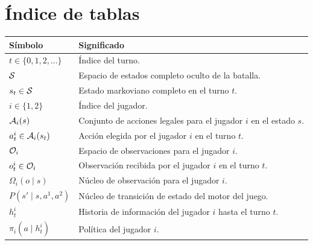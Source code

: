 \section{Índice de tablas}

\begin{table}[h]
    \centering
    \begin{tabular}{ll}
        \toprule
        Símbolo                              & Significado                                                                            \\
        \midrule
        $t \in \{0,1,2,\dots\}$              & Índice del turno.                                                                      \\
        $\mathcal{S}$                                & Espacio de estados completo oculto de la batalla.                                      \\
        $s_t \in \mathcal{S}$                        & Estado markoviano completo en el turno $t$.                                            \\
        $i \in \{1,2\}$                      & Índice del jugador.                                                                    \\
        $\mathcal{A}_i(s)$                           & Conjunto de acciones legales para el jugador $i$ en el estado $s$.                     \\
        $a_t^i \in \mathcal{A}_i(s_t)$               & Acción elegida por el jugador $i$ en el turno $t$.                                     \\
        $\mathcal{O}_i$                              & Espacio de observaciones para el jugador $i$.                                          \\
        $o_t^i \in \mathcal{O}_i$                    & Observación recibida por el jugador $i$ en el turno $t$.                               \\
        $\Omega_i(o\mid s)$                  & Núcleo de observación para el jugador $i$.                                             \\
        $P(s'\mid s,a^1,a^2)$                & Núcleo de transición de estado del motor del juego.                                    \\
        $h_t^i$                              & Historia de información del jugador $i$ hasta el turno $t$.                            \\
        $\pi_i(a\mid h_t^i)$                 & Política del jugador $i$.                                                              \\

\end{tabular}
\end{table}
